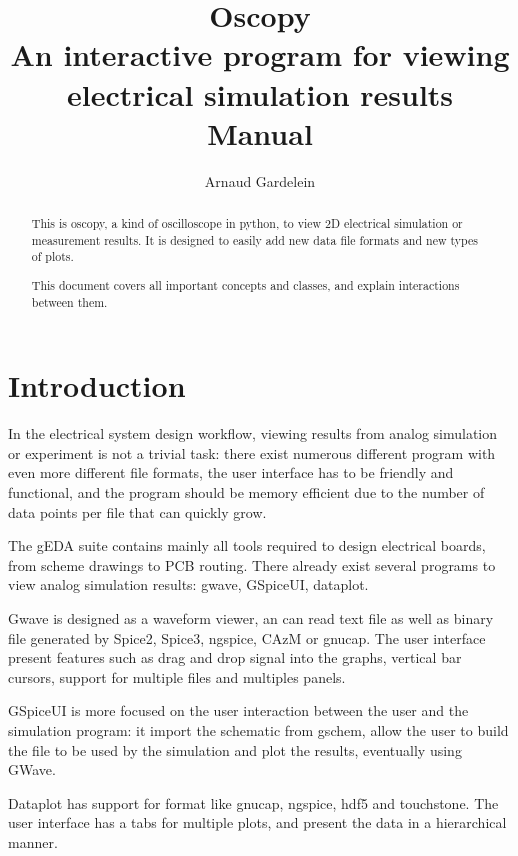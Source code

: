 \documentclass[a4paper,11pt]{article}
\title{{\sc Oscopy}\\An interactive program for viewing electrical simulation results\\Manual}
\author{Arnaud Gardelein}
\begin{document}
\maketitle
\begin{abstract}
This is oscopy, a kind of oscilloscope in python, to view 2D electrical
simulation or measurement results.
It is designed to easily add new data file formats and new types of plots.

This document covers all important concepts and classes, and explain interactions between them.
\end{abstract}

\section{Introduction}
\label{sec:intro}
In the electrical system design workflow, viewing results from analog simulation or experi\-ment is not a trivial task: there exist numerous different program with even more different file formats, the user interface has to be friendly and functional, and the program should be memory efficient due to the number of data points per file that can quickly grow.

The gEDA suite contains mainly all tools required to design electrical boards, from scheme drawings to PCB routing.
There already exist several programs to view analog simulation results: gwave, GSpiceUI, dataplot.

Gwave is designed as a waveform viewer, an can read text file as well as binary file generated by Spice2, Spice3, ngspice, CAzM or gnucap.
The user interface present features such as drag and drop signal into the graphs, vertical bar cursors, support for multiple files and multiples panels.

GSpiceUI is more focused on the user interaction between the user and the simulation program: it import the schematic from gschem, allow the user to build the file to be used by the simulation and plot the results, eventually using GWave.

Dataplot has support for format like gnucap, ngspice, hdf5 and touchstone.
The user interface has a tabs for multiple plots, and present the data in a hierarchical manner.
\end{document}
